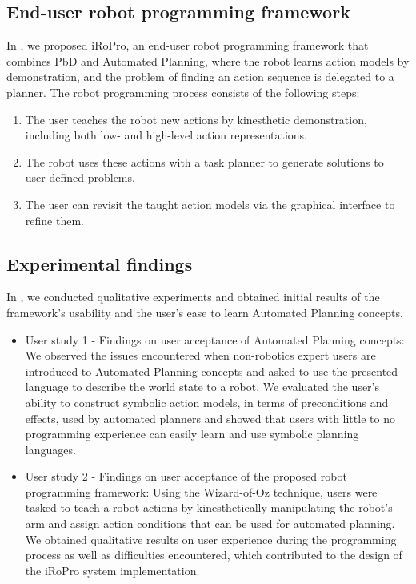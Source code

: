 \subsection{End-user robot programming framework}
In , we proposed iRoPro, an end-user robot programming framework that combines PbD and Automated Planning, where the robot learns action models by demonstration, and the problem of finding an action sequence is delegated to a planner.
The robot programming process consists of the following steps:
		\begin{enumerate}
			\item The user teaches the robot new actions by kinesthetic demonstration, including both low- and high-level action representations.
			\item The robot uses these actions with a task planner to generate solutions to user-defined problems.
			\item The user can revisit the taught action models via the graphical interface to refine them.
		\end{enumerate}

	
\subsection{Experimental findings}
In , we conducted qualitative experiments and obtained initial results of the framework's usability and the user's ease to learn Automated Planning concepts.
\begin{itemize}
	\item {User study 1 - Findings on user acceptance of Automated Planning concepts:
		We observed the issues encountered when non-robotics expert users are introduced to Automated Planning concepts and asked to use the presented language to describe the world state to a robot. 
		We evaluated the user's ability to construct symbolic action models, in terms of preconditions and effects, used by automated planners and showed that users with little to no programming experience can easily learn and use symbolic planning languages.
	}
	\item {User study 2 - Findings on user acceptance of the proposed robot programming framework:
	Using the Wizard-of-Oz technique, users were tasked to teach a robot actions by kinesthetically manipulating the robot's arm and assign action conditions that can be used for automated planning.
	We obtained qualitative results on user experience during the programming process as well as difficulties encountered, which contributed to the design of the iRoPro system implementation.
	}
\end{itemize}
	
